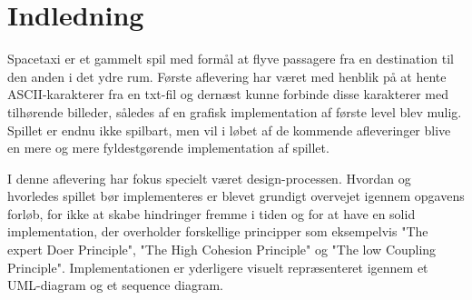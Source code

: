 

\section{Indledning}

Spacetaxi er et gammelt spil med formål at flyve passagere fra en destination til den anden i det ydre rum. Første aflevering har været med henblik på at hente ASCII-karakterer fra en txt-fil
og dernæst kunne forbinde disse karakterer med tilhørende billeder, således af en grafisk implementation af første level blev mulig. Spillet er endnu ikke spilbart, men vil i løbet af de kommende afleveringer blive en mere og mere fyldestgørende implementation af spillet.

I denne aflevering har fokus specielt været design-processen. Hvordan og hvorledes spillet bør implementeres er blevet grundigt overvejet igennem opgavens forløb, for ikke at skabe hindringer fremme i tiden og for at have en solid implementation, der overholder forskellige principper som eksempelvis "The expert Doer Principle", "The High Cohesion Principle" og "The low Coupling Principle".
Implementationen er yderligere visuelt repræsenteret igennem et UML-diagram og et sequence diagram.



